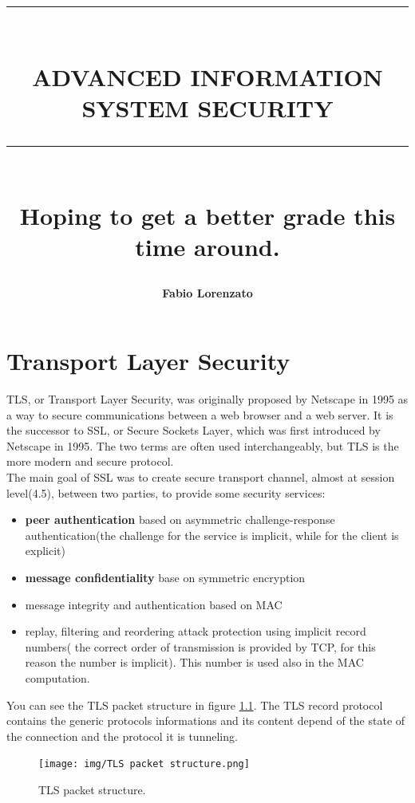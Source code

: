\documentclass{report}
\newcommand{\HRule}[1]{\rule{\linewidth}{#1}}
\begin{document}

\title{ \normalsize \textsc{}
		\\ [2.0cm]
		\HRule{1.5pt} \\
    \LARGE \textbf{\uppercase{Advanced Information System Security}}
		\HRule{2.0pt} \\ [0.6cm] \LARGE{Hoping to get a better grade this time around.} \vspace*{10\baselineskip}}
\author{\textbf{Fabio Lorenzato}} 
		

\maketitle
\newpage

\tableofcontents
\newpage
\chapter{Transport Layer Security}
TLS, or Transport Layer Security, was originally proposed by Netscape
in 1995 as a way to secure communications between a web browser and a
web server. It is the successor to SSL, or Secure Sockets Layer, which
was first introduced by Netscape in 1995. The two terms are often used
interchangeably, but TLS is the more modern and secure protocol.\\ 
The main goal of SSL was to create secure transport channel, almost at
session level(4.5), between two parties, to provide some security
services:
\begin{itemize}
  \item \textbf{peer authentication} based on asymmetric
    challenge-response authentication(the challenge for the service is
    implicit, while for the client is explicit)
  \item \textbf{message confidentiality} base on symmetric encryption
  \item message integrity and authentication based on MAC
  \item replay, filtering and reordering attack protection using
    implicit record numbers( the correct order of transmission is
    provided by TCP, for this reason the number is implicit). This
    number is used also in the MAC computation.

\end{itemize}

You can see the TLS packet structure in figure
\ref{fig:tls-packet-structure}.
The TLS record protocol contains the generic protocols informations
and its content depend of the state of the connection and the protocol
it is tunneling.
\begin{figure}[H]
    \centering
    \texttt{[image: img/TLS packet
    structure.png]}
    \caption{TLS packet structure.}
    \label{fig:tls-packet-structure}
\end{figure}
\end{document}
